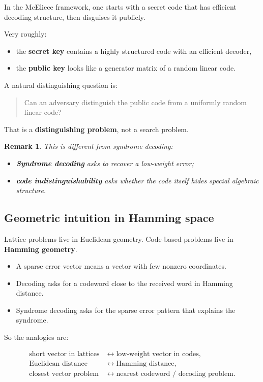 \documentclass[11pt]{article}
\newtheorem{remark}{Remark}
\begin{document}
	In the McEliece framework, one starts with a secret code that has efficient decoding structure, then disguises it publicly.
	
	Very roughly:
	\begin{itemize}
		\item the \textbf{secret key} contains a highly structured code with an efficient decoder,
		\item the \textbf{public key} looks like a generator matrix of a random linear code.
	\end{itemize}
	
	A natural distinguishing question is:
	
	\begin{quote}
		Can an adversary distinguish the public code from a uniformly random linear code?
	\end{quote}
	
	That is a \textbf{distinguishing problem}, not a search problem.
	
	\begin{remark}
		This is different from syndrome decoding:
		\begin{itemize}
			\item \textbf{Syndrome decoding} asks to recover a low-weight error;
			\item \textbf{code indistinguishability} asks whether the code itself hides special algebraic structure.
		\end{itemize}
	\end{remark}
	
	\subsection{Geometric intuition in Hamming space}
	
	Lattice problems live in Euclidean geometry.  
	Code-based problems live in \textbf{Hamming geometry}.
	
	\begin{itemize}
		\item A sparse error vector means a vector with few nonzero coordinates.
		\item Decoding asks for a codeword close to the received word in Hamming distance.
		\item Syndrome decoding asks for the sparse error pattern that explains the syndrome.
	\end{itemize}
	
	So the analogies are:
	
	\[
	\begin{aligned}
		\text{short vector in lattices}
		&\longleftrightarrow
		\text{low-weight vector in codes},\\[4pt]
		\text{Euclidean distance}
		&\longleftrightarrow
		\text{Hamming distance},\\[4pt]
		\text{closest vector problem}
		&\longleftrightarrow
		\text{nearest codeword / decoding problem}.
	\end{aligned}
	\]
	
\end{document}
